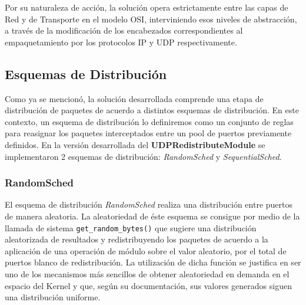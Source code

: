 Por su naturaleza de acción, la solución opera estrictamente entre las capas de Red y de Transporte en el modelo OSI, interviniendo esos niveles de abstracción, a través de la modificación de los encabezados correspondientes al empaquetamiento por los protocolos IP y UDP respectivamente.

\subsection{Esquemas de Distribución}
Como ya se mencionó, la solución desarrollada comprende una etapa de distribución de paquetes de acuerdo a distintos esquemas de distribución. En este contexto, un esquema de distribución lo definiremos como un conjunto de reglas para reasignar los paquetes interceptados entre un pool de puertos previamente definidos. En la versión desarrollada del \textbf{UDPRedistributeModule} se implementaron 2 esquemas de distribución: \emph{RandomSched} y \emph{SequentialSched}.

\subsubsection{RandomSched}
El esquema de distribución \emph{RandomSched} realiza una distribución entre puertos de manera aleatoria. La aleatoriedad de éste esquema se consigue por medio de la llamada de sistema \verb=get_random_bytes()= que sugiere una distribución aleatorizada de resultados y redistribuyendo los paquetes de acuerdo a la aplicación de una operación de módulo sobre el valor aleatorio, por el total de puertos blanco de redistribución. La utilización de dicha función se justifica en ser uno de los mecanismos más sencillos de obtener aleatoriedad en demanda en el espacio del Kernel y que, según su documentación, sus valores generados siguen una distribución uniforme.

